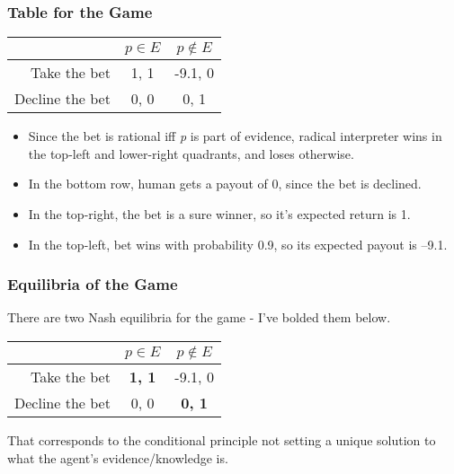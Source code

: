 \begin{frame}

\frametitle{Table for the Game}
\label{tableforthegame}


\begin{center}
\begin{tabular}{r | c c}
& $p \in E$ & $p \notin E$ \\ \hline
Take the bet & 1, 1 & -9.1, 0 \\
Decline the bet & 0, 0 & 0, 1
\end{tabular}
\end{center}


\begin{itemize}
\item Since the bet is rational iff \emph{p} is part of evidence, radical interpreter wins in the top-left and lower-right quadrants, and loses otherwise.

\item In the bottom row, human gets a payout of 0, since the bet is declined.

\item In the top-right, the bet is a sure winner, so it's expected return is 1.

\item In the top-left, bet wins with probability 0.9, so its expected payout is --9.1.

\end{itemize}

\end{frame}

\begin{frame}

\frametitle{Equilibria of the Game}
\label{equilibriaofthegame}

There are two Nash equilibria for the game - I've bolded them below.


\begin{center}
\begin{tabular}{r | c c}
& $p \in E$ & $p \notin E$ \\ \hline
Take the bet & \textbf{1, 1} & -9.1, 0 \\
Decline the bet & 0, 0 & \textbf{0, 1}
\end{tabular}
\end{center}


That corresponds to the conditional principle not setting a unique solution to what the agent's evidence\slash knowledge is.

\end{frame}

